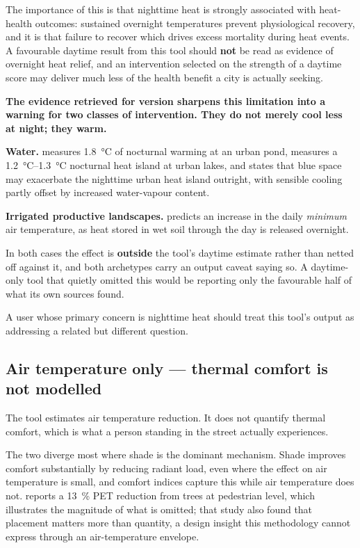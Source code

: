 The importance of this is that nighttime heat is strongly associated with
heat-health outcomes: sustained overnight temperatures prevent physiological
recovery, and it is that failure to recover which drives excess mortality
during heat events. A favourable daytime result from this tool should
\textbf{not} be read as evidence of overnight heat relief, and an intervention
selected on the strength of a daytime score may deliver much less of the
health benefit a city is actually seeking.

\begin{keynote}
\noindent\textbf{The evidence retrieved for version \methver{} sharpens this
limitation into a warning for two classes of intervention. They do not merely
cool less at night; they warm.}

\textbf{Water.} \textcite{yao2023b} measures \qty{1.8}{\degreeCelsius} of
nocturnal warming at an urban pond, \textcite{yao2023a} measures a
\SIrange{1.2}{1.3}{\degreeCelsius} nocturnal heat island at urban lakes, and
\textcite{ampatzidis2020} states that blue space may exacerbate the nighttime
urban heat island outright, with sensible cooling partly offset by increased
water-vapour content.

\textbf{Irrigated productive landscapes.} \textcite{cheung2022} predicts an
increase in the daily \emph{minimum} air temperature, as heat stored in wet
soil through the day is released overnight.

In both cases the effect is \textbf{outside} the tool's daytime estimate rather
than netted off against it, and both archetypes carry an output caveat saying
so. A daytime-only tool that quietly omitted this would be reporting only the
favourable half of what its own sources found.
\end{keynote}

A user whose primary concern is nighttime heat should treat this tool's output
as addressing a related but different question.

\subsection{Air temperature only --- thermal comfort is not modelled}
\label{sec:limit-airtemp}

The tool estimates air temperature reduction. It does not quantify thermal
comfort, which is what a person standing in the street actually experiences.

The two diverge most where shade is the dominant mechanism. Shade improves
comfort substantially by reducing radiant load, even where the effect on air
temperature is small, and comfort indices capture this while air temperature
does not. \textcite{zolch2016} reports a \SI{13}{\percent} PET reduction from
trees at pedestrian level, which illustrates the magnitude of what is omitted;
that study also found that placement matters more than quantity, a design
insight this methodology cannot express through an air-temperature envelope.

